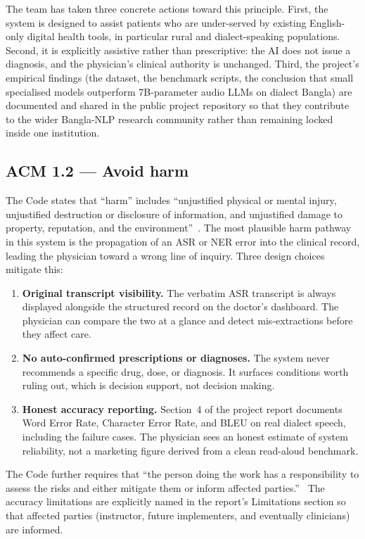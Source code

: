 \documentclass[12pt,a4paper]{article}
\begin{document}
The team has taken three concrete actions toward this principle.
First, the system is designed to assist patients who are
under-served by existing English-only digital health tools, in
particular rural and dialect-speaking populations. Second, it is
explicitly assistive rather than prescriptive: the AI does not
issue a diagnosis, and the physician's clinical authority is
unchanged. Third, the project's empirical findings (the dataset, the
benchmark scripts, the conclusion that small specialised models
outperform 7B-parameter audio LLMs on dialect Bangla) are
documented and shared in the public project repository so that they
contribute to the wider Bangla-NLP research community rather than
remaining locked inside one institution.

\subsection{ACM 1.2 --- Avoid harm}

The Code states that ``harm'' includes ``unjustified physical or
mental injury, unjustified destruction or disclosure of information,
and unjustified damage to property, reputation, and the
environment''~\cite{eth:acm2018}. The most plausible harm pathway in
this system is the propagation of an ASR or NER error into the
clinical record, leading the physician toward a wrong line of
inquiry. Three design choices mitigate this:

\begin{enumerate}[leftmargin=*]
\item \textbf{Original transcript visibility.} The verbatim ASR
transcript is always displayed alongside the structured record on
the doctor's dashboard. The physician can compare the two at a
glance and detect mis-extractions before they affect care.
\item \textbf{No auto-confirmed prescriptions or diagnoses.} The
system never recommends a specific drug, dose, or diagnosis. It
surfaces conditions worth ruling out, which is decision support, not
decision making.
\item \textbf{Honest accuracy reporting.} Section~4 of the project
report documents Word Error Rate, Character Error Rate, and BLEU on
real dialect speech, including the failure cases. The physician
sees an honest estimate of system reliability, not a marketing
figure derived from a clean read-aloud benchmark.
\end{enumerate}

The Code further requires that ``the person doing the work has a
responsibility to assess the risks and either mitigate them or
inform affected parties.''~\cite{eth:acm2018} The accuracy
limitations are explicitly named in the report's Limitations
section so that affected parties (instructor, future
implementers, and eventually clinicians) are informed.
\end{document}
